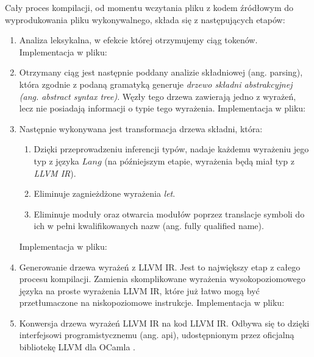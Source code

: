 \documentclass[declaration,shortabstract]{iithesis}
\begin{document}
Cały proces kompilacji, od momentu wczytania pliku z kodem źródłowym do 
wyprodukowania pliku wykonywalnego, składa się z następujących etapów:
\begin{enumerate}
  \item Analiza leksykalna, w efekcie której otrzymujemy ciąg tokenów. 
  Implementacja w pliku: 

  \item Otrzymany ciąg jest następnie poddany analizie składniowej 
  (ang. parsing), która zgodnie z podaną gramatyką generuje \textit{drzewo 
  składni abstrakcyjnej (ang. abstract syntax tree)}. Węzły tego drzewa 
  zawierają jedno z wyrażeń, lecz nie posiadają informacji o typie tego
  wyrażenia. Implementacja w pliku: \newline
 
  \item Następnie wykonywana jest transformacja drzewa składni, która:

  \begin{enumerate}
    \item Dzięki przeprowadzeniu inferencji typów, nadaje każdemu wyrażeniu jego typ z języka $Lang$ (na późniejszym etapie, wyrażenia będą miał typ 
    z \textit{LLVM IR}). 
    \item Eliminuje zagnieżdżone wyrażenia \textit{let}.
    \item Eliminuje moduły oraz otwarcia modułów poprzez translacje symboli do 
    ich w pełni kwalifikowanych nazw (ang. fully qualified name).
  \end{enumerate}
  Implementacja w pliku: 

  \item Generowanie drzewa wyrażeń z LLVM IR. Jest to największy etap z całego 
  procesu kompilacji. Zamienia skomplikowane wyrażenia wysokopoziomowego języka
  na proste wyrażenia LLVM IR, które już łatwo mogą być przetłumaczone na 
  niskopoziomowe instrukcje.
  Implementacja w pliku: 

  \item Konwersja drzewa wyrażeń LLVM IR na kod LLVM IR. Odbywa się to dzięki 
  interfejsowi programistycznemu (ang. api), udostępnionym przez oficjalną 
  bibliotekę LLVM dla OCamla \cite{llvm_in_ocaml}.

\end{enumerate}
\end{document}

